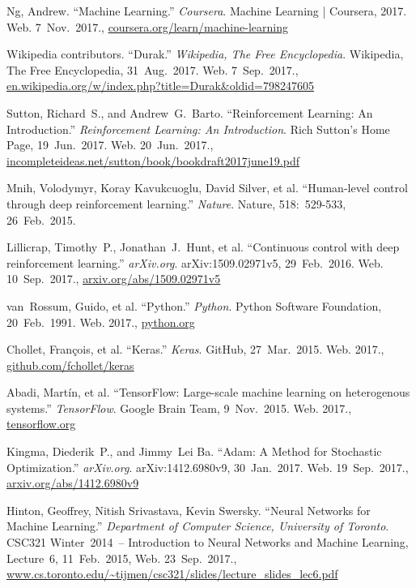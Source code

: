 \documentclass[a4paper,titlepage]{article}
\begin{document}
\newpage

\begin{thebibliography}{99}

  Ng, Andrew. ``Machine Learning.'' \emph{Coursera}. Machine Learning | Coursera, 2017. Web. 7~Nov.~2017.,
  \url{coursera.org/learn/machine-learning}

  Wikipedia contributors. ``Durak.'' \emph{Wikipedia, The Free Encyclopedia}. Wikipedia, The Free Encyclopedia, 31~Aug.~2017. Web.
  7~Sep.~2017.,
  \url{en.wikipedia.org/w/index.php?title=Durak&oldid=798247605}

  Sutton, Richard~S., and Andrew~G.\ Barto. ``Reinforcement Learning: An Introduction.'' \emph{Reinforcement Learning: An Introduction}. Rich Sutton's Home Page, 19~Jun.~2017. Web.
  20~Jun.~2017.,
  \url{incompleteideas.net/sutton/book/bookdraft2017june19.pdf}

  Mnih, Volodymyr, Koray Kavukcuoglu, David Silver, et al. ``Human-level control through deep reinforcement learning.'' \emph{Nature}. Nature, 518:~529-533, 26~Feb.~2015.

  Lillicrap, Timothy~P., Jonathan~J.\ Hunt, et al. ``Continuous control with deep reinforcement learning.'' \emph{arXiv.org}. arXiv:1509.02971v5, 29~Feb.~2016. Web.
  10~Sep.~2017.,
  \url{arxiv.org/abs/1509.02971v5}

  van~Rossum, Guido, et al. ``Python.'' \emph{Python}. Python Software Foundation, 20~Feb.~1991. Web.
  2017.,
  \url{python.org}

  Chollet, Fran\c{c}ois, et al. ``Keras.'' \emph{Keras}. GitHub, 27~Mar.~2015. Web.
  2017.,
  \url{github.com/fchollet/keras}

  Abadi, Martín, et al. ``TensorFlow: Large-scale machine learning on heterogenous systems.'' \emph{TensorFlow}. Google Brain Team, 9~Nov.~2015. Web.
  2017.,
  \url{tensorflow.org}

  Kingma, Diederik~P., and Jimmy~Lei Ba. ``Adam: A Method for Stochastic Optimization.'' \emph{arXiv.org}. arXiv:1412.6980v9, 30~Jan.~2017. Web.
  19~Sep.~2017.,
  \url{arxiv.org/abs/1412.6980v9}

  Hinton, Geoffrey, Nitish Srivastava, Kevin Swersky. ``Neural Networks for Machine Learning.'' \emph{Department of Computer Science, University of Toronto}. CSC321 Winter~2014~-- Introduction to Neural Networks and Machine Learning, Lecture~6, 11~Feb.~2015, Web. 23~Sep.~2017.,
  \url{www.cs.toronto.edu/~tijmen/csc321/slides/lecture_slides_lec6.pdf}


\end{thebibliography}
\end{document}
